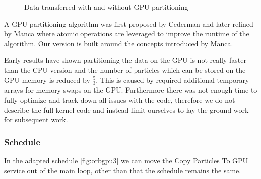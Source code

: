 \documentclass[]{article}
\begin{document}
\begin{figure}[H]
	\begin{center}
		\caption{Data transferred with and without GPU partitioning}
		\label{fig:transfer}
	\end{center}
\end{figure}


A GPU partitioning algorithm was first proposed by Cederman \cite{GPUQ} and later refined by Manca \cite{CUDAQ} where atomic operations are leveraged to improve the runtime of the algorithm. Our version is built around the concepts introduced by Manca. 

Early results have shown partitioning the data on the GPU is not really faster than the CPU version and the number of particles which can be stored on the GPU memory is reduced by $\frac{5}{3}$. This is caused by required additional temporary arrays for memory swaps on the GPU. Furthermore there was not enough time to fully optimize and track down all issues with the code, therefore we do not describe the full kernel code and instead limit ourselves to lay the ground work for subsequent work. 

\subsubsection{Schedule}

In the adapted schedule \ref{fig:orbgpu3} we can move the Copy Particles To GPU service out of the main loop, other than that the schedule remains the same. 
\end{document}
